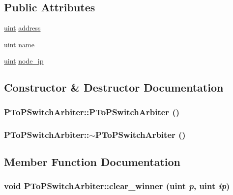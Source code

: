\subsection*{Public Attributes}
\begin{CompactItemize}
\item 
\hyperlink{outputBuffer_8h_91ad9478d81a7aaf2593e8d9c3d06a14}{uint} \hyperlink{classPToPSwitchArbiter_a01c0b9c63131ca029da5129d417ce0e}{address}
\item 
\hyperlink{outputBuffer_8h_91ad9478d81a7aaf2593e8d9c3d06a14}{uint} \hyperlink{classPToPSwitchArbiter_dd46ae5be50681b3e7e0a779466fe8e4}{name}
\item 
\hyperlink{outputBuffer_8h_91ad9478d81a7aaf2593e8d9c3d06a14}{uint} \hyperlink{classPToPSwitchArbiter_f6d6c3726dfca65b1dec2d041ce29e97}{node\_\-ip}
\end{CompactItemize}


\subsection{Constructor \& Destructor Documentation}
\hypertarget{classPToPSwitchArbiter_dc9c6f383f3f135ca2fa003380b52021}{
\subsubsection[{PToPSwitchArbiter}]{\setlength{\rightskip}{0pt plus 5cm}PToPSwitchArbiter::PToPSwitchArbiter ()}}
\label{classPToPSwitchArbiter_dc9c6f383f3f135ca2fa003380b52021}


\hypertarget{classPToPSwitchArbiter_f59e4ed8cfb944b1ca266cdfc413b078}{
\subsubsection[{$\sim$PToPSwitchArbiter}]{\setlength{\rightskip}{0pt plus 5cm}PToPSwitchArbiter::$\sim$PToPSwitchArbiter ()}}
\label{classPToPSwitchArbiter_f59e4ed8cfb944b1ca266cdfc413b078}




\subsection{Member Function Documentation}
\hypertarget{classPToPSwitchArbiter_752c022c63e6552d06798d65e634f8d4}{
\subsubsection[{clear\_\-winner}]{\setlength{\rightskip}{0pt plus 5cm}void PToPSwitchArbiter::clear\_\-winner ({\bf uint} {\em p}, \/  {\bf uint} {\em ip})}}
\label{classPToPSwitchArbiter_752c022c63e6552d06798d65e634f8d4}


